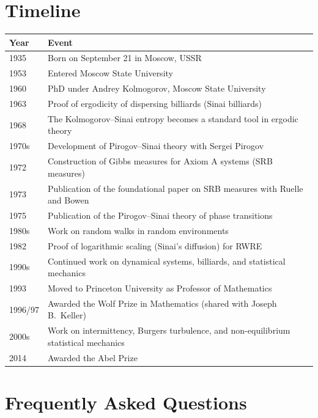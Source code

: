 \section*{Timeline}
\begin{tabularx}{\linewidth}{|p{1.5cm}|>{\raggedright\arraybackslash}X|}
\hline
\textbf{Year} & \textbf{Event} \\ \hline
1935 & Born on September 21 in Moscow, USSR \\ \hline
1953 & Entered Moscow State University \\ \hline
1960 & PhD under Andrey Kolmogorov, Moscow State University \\ \hline
1963 & Proof of ergodicity of dispersing billiards (Sinai billiards) \\ \hline
1968 & The Kolmogorov--Sinai entropy becomes a standard tool in ergodic theory \\ \hline
1970s & Development of Pirogov--Sinai theory with Sergei Pirogov \\ \hline
1972 & Construction of Gibbs measures for Axiom A systems (SRB measures) \\ \hline
1973 & Publication of the foundational paper on SRB measures with Ruelle and Bowen \\ \hline
1975 & Publication of the Pirogov--Sinai theory of phase transitions \\ \hline
1980s & Work on random walks in random environments \\ \hline
1982 & Proof of logarithmic scaling (Sinai's diffusion) for RWRE \\ \hline
1990s & Continued work on dynamical systems, billiards, and statistical mechanics \\ \hline
1993 & Moved to Princeton University as Professor of Mathematics \\ \hline
1996/97 & Awarded the Wolf Prize in Mathematics (shared with Joseph B.\ Keller) \\ \hline
2000s & Work on intermittency, Burgers turbulence, and non-equilibrium statistical mechanics \\ \hline
2014 & Awarded the Abel Prize \\ \hline
\end{tabularx}

\section{Frequently Asked Questions}

